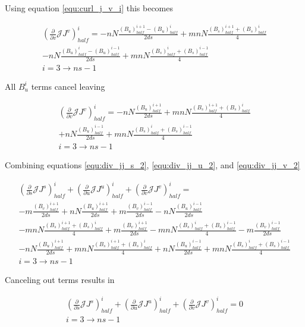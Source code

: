 \documentclass[11pt]{article}
\newcommand{\brackets}[1]{\left(#1\right)}
\newcommand{\equ}[2]{
	\begin{equation}
    \begin{split}
	#1
	\label{#2}
	\end{split}
	\end{equation}
}
\begin{document}
Using equation \ref{equ:curl_j_v_i} this becomes
\equ{
\brackets{\frac{\partial}{\partial v}\mathcal{J}J^{v}}^{i}_{half}=-nN\frac{\brackets{B_{u}}^{i+1}_{half}-\brackets{B_{u}}^{i}_{half}}{2ds}+mnN\frac{\brackets{B_{s}}^{i+1}_{half}+\brackets{B_{s}}^{i}_{half}}{4}\\
-nN\frac{\brackets{B_{u}}^{i}_{half}-\brackets{B_{u}}^{i-1}_{half}}{2ds}+mnN\frac{\brackets{B_{s}}^{i}_{half}+\brackets{B_{s}}^{i-1}_{half}}{4}\\
i=3\rightarrow ns-1
}{equ:div_jj_v_1}
All $B^{i}_u$ terms cancel leaving
\equ{
\brackets{\frac{\partial}{\partial v}\mathcal{J}J^{v}}^{i}_{half}=-nN\frac{\brackets{B_{u}}^{i+1}_{half}}{2ds}+mnN\frac{\brackets{B_{s}}^{i+1}_{half}+\brackets{B_{s}}^{i}_{half}}{4}\\
+nN\frac{\brackets{B_{u}}^{i-1}_{half}}{2ds}+mnN\frac{\brackets{B_{s}}^{i}_{half}+\brackets{B_{s}}^{i-1}_{half}}{4}\\
i=3\rightarrow ns-1
}{equ:div_jj_v_2}
Combining equations \ref{equ:div_jj_s_2}, \ref{equ:div_jj_u_2}, and \ref{equ:div_jj_v_2}
\equ{
\brackets{\frac{\partial}{\partial s}\mathcal{J}J^{s}}^{i}_{half}+\brackets{\frac{\partial}{\partial u}\mathcal{J}J^{u}}^{i}_{half}+\brackets{\frac{\partial}{\partial v}\mathcal{J}J^{v}}^{i}_{half}=\\
-m\frac{\brackets{B_{v}}^{i+1}_{half}}{2ds}+nN\frac{\brackets{B_{u}}^{i+1}_{half}}{2ds}+m\frac{\brackets{B_{v}}^{i-1}_{half}}{2ds}-nN\frac{\brackets{B_{u}}^{i-1}_{half}}{2ds}\\
-mnN\frac{\brackets{B_{s}}^{i+1}_{half}+\brackets{B_{s}}^{i}_{half}}{4}+m\frac{\brackets{B_{v}}^{i+1}_{half}}{2ds}-mnN\frac{\brackets{B_{s}}^{i}_{half}+\brackets{B_{s}}^{i-1}_{half}}{4}-m\frac{\brackets{B_{v}}^{i-1}_{half}}{2ds}\\
-nN\frac{\brackets{B_{u}}^{i+1}_{half}}{2ds}+mnN\frac{\brackets{B_{s}}^{i+1}_{half}+\brackets{B_{s}}^{i}_{half}}{4}+nN\frac{\brackets{B_{u}}^{i-1}_{half}}{2ds}+mnN\frac{\brackets{B_{s}}^{i}_{half}+\brackets{B_{s}}^{i-1}_{half}}{4}\\
i=3\rightarrow ns-1
}{equ:div_j_total}
Canceling out terms results in
\equ{
\brackets{\frac{\partial}{\partial s}\mathcal{J}J^{s}}^{i}_{half}+\brackets{\frac{\partial}{\partial u}\mathcal{J}J^{u}}^{i}_{half}+\brackets{\frac{\partial}{\partial v}\mathcal{J}J^{v}}^{i}_{half}=0\\
i=3\rightarrow ns-1
}{equ:div_j_total_1}
\end{document}
